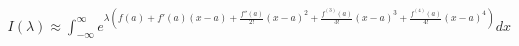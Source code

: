 \documentclass[preview]{standalone}
\begin{document}
\begin{align*}
I(\lambda) \approx \displaystyle \int_{-\infty}^{\infty}e^{\lambda (f(a) + f'(a)(x - a) + \frac{f''(a)}{2!}(x - a)^2 + \frac{f^{(3)}(a)}{3!}(x - a)^3 + \frac{f^{(4)}(a)}{4!}(x - a)^4)}dx
\end{align*}
\end{document}
